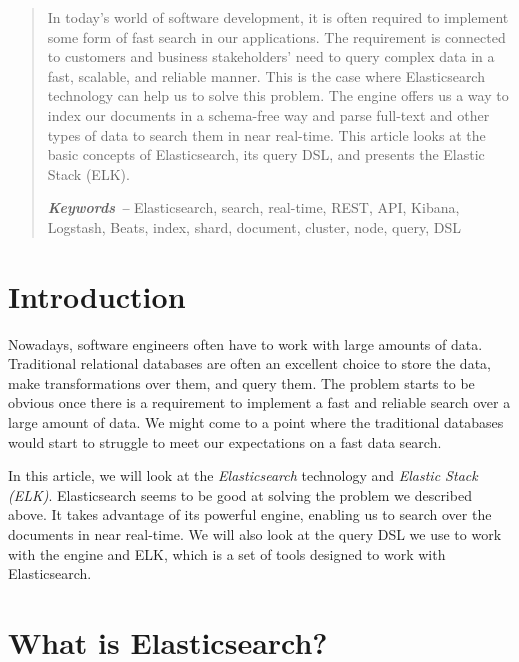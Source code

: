 \documentclass[12pt,a4,twoside]{article}
\providecommand{\keywords}[1]
{
    \small	
    \textbf{\textit{Keywords -- }} #1
}
\begin{document}
\newpage

\begin{abstract}

In today's world of software development, it is often required to implement some form of fast search in our applications. The requirement is connected to customers and business stakeholders' need to query complex data in a fast, scalable, and reliable manner. This is the case where Elasticsearch technology can help us to solve this problem. The engine offers us a way to index our documents in a schema-free way and parse full-text and other types of data to search them in near real-time. This article looks at the basic concepts of Elasticsearch, its query DSL, and presents the Elastic Stack (ELK).\\

\noindent
\keywords{Elasticsearch, search, real-time, REST, API, Kibana, Logstash, Beats, index, shard, document, cluster, node, query, DSL}
\end{abstract}

\tableofcontents
\newpage

\section*{Introduction}

Nowadays, software engineers often have to work with large amounts of data. Traditional relational databases are often an excellent choice to store the data, make transformations over them, and query them. The problem starts to be obvious once there is a requirement to implement a fast and reliable search over a large amount of data. We might come to a point where the traditional databases would start to struggle to meet our expectations on a fast data search.

In this article, we will look at the \textit{Elasticsearch} technology and \textit{Elastic Stack (ELK)}. Elasticsearch seems to be good at solving the problem we described above. It takes advantage of its powerful engine, enabling us to search over the documents in near real-time. We will also look at the query DSL we use to work with the engine and ELK, which is a set of tools designed to work with Elasticsearch.

\newpage

\section{What is Elasticsearch?}
\end{document}
